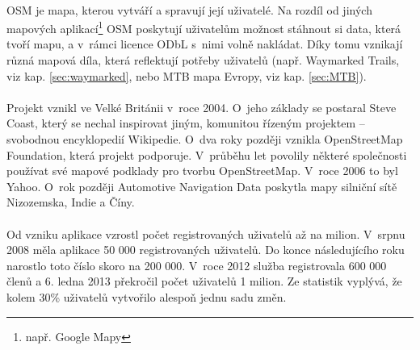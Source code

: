 \documentclass[11pt,a4paper,titlepage,oneside]{book}
\begin{document}

		\paragraph{} \acl{OSM} je mapa, kterou vytváří a spravují její uživatelé. Na rozdíl od jiných mapových aplikací\footnote{např. Google Mapy} \acl{OSM} poskytují uživatelům možnost stáhnout si data, která tvoří mapu, a v~rámci licence \ac{ODbL} s~nimi volně nakládat. Díky tomu vznikají různá mapová díla, která reflektují potřeby uživatelů (např. Waymarked Trails, viz kap. \ref{sec:waymarked}, nebo MTB mapa Evropy, viz kap. \ref{sec:MTB}). 
		\paragraph{}Projekt vznikl ve Velké Británii v~roce 2004. O~jeho základy se postaral Steve Coast, který se nechal inspirovat jiným, komunitou řízeným projektem -- svobodnou encyklopedií Wikipedie. O~dva roky později vznikla OpenStreetMap Foundation, která projekt podporuje. V~průběhu let povolily některé společnosti používat své mapové podklady pro tvorbu OpenStreetMap. V~roce 2006 to byl Yahoo. O~rok později Automotive Navigation Data poskytla mapy silniční sítě Nizozemska, Indie a Číny\cite{osm_wikipedia_en}.
		\paragraph{} Od vzniku aplikace vzrostl počet registrovaných uživatelů až na milion. V~srpnu 2008 měla aplikace 50 000 registrovaných uživatelů. Do konce násle\-dujícího roku narostlo toto číslo skoro na  200 000. V~roce 2012 služba registrovala 600 000 členů a 6. ledna 2013 překročil počet uživatelů 1 milion. Ze statistik vyplývá, že kolem 30\% uživatelů vytvořilo alespoň jednu sadu změn\cite{neis}.

                
\end{document}
